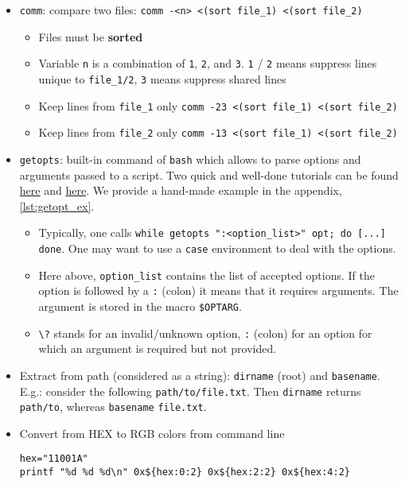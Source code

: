 \documentclass[a4paper,12pt,%
              final%
              ]{article}
\begin{document}
\begin{itemize}
\begin{itemize}
    \end{itemize}
  \item \texttt{comm}: compare two files: \verb|comm -<n> <(sort file_1) <(sort file_2)|
    \begin{itemize}
      \item Files must be \textbf{sorted}
      \item Variable \texttt{n} is a combination of \texttt{1}, \texttt{2}, and \texttt{3}. \texttt{1} / \texttt{2} means suppress lines unique to \verb|file_1/2|, \texttt{3} means suppress shared lines
      \item Keep lines from \verb|file_1| only \verb|comm -23 <(sort file_1) <(sort file_2)|
      \item Keep lines from \verb|file_2| only \verb|comm -13 <(sort file_1) <(sort file_2)|
    \end{itemize}
  \item \texttt{getopts}: built-in command of \texttt{bash} which allows to parse options and arguments passed to a script. Two quick and well-done tutorials can be found \href{https://www.computerhope.com/unix/bash/getopts.htm}{here} and \href{https://sookocheff.com/post/bash/parsing-bash-script-arguments-with-shopts/}{here}. We provide a hand-made example in the appendix, \autoref{lst:getopt_ex}.
    \begin{itemize}
      \item Typically, one calls \verb|while getopts ":<option_list>" opt; do [...] done|. One may want to use a \verb|case| environment to deal with the options.
      \item Here above, \verb|option_list| contains the list of accepted options. If the option is followed by a \verb|:| (colon) it means that it requires arguments. The argument is stored in the macro \verb|$OPTARG|.
      \item \verb|\?| stands for an invalid/unknown option, \verb|:| (colon) for an option for which an argument is required but not provided.
    \end{itemize}
  \item Extract from path (considered as a string): \texttt{dirname} (root) and \texttt{basename}. E.g.: consider the following \texttt{path/to/file.txt}. Then \texttt{dirname} returns \texttt{path/to}, whereas \texttt{basename} \texttt{file.txt}.
  \item Convert from HEX to RGB colors from command line
\begin{verbatim}
hex="11001A"
printf "%d %d %d\n" 0x${hex:0:2} 0x${hex:2:2} 0x${hex:4:2}
\end{verbatim}
\end{itemize}
\end{document}
